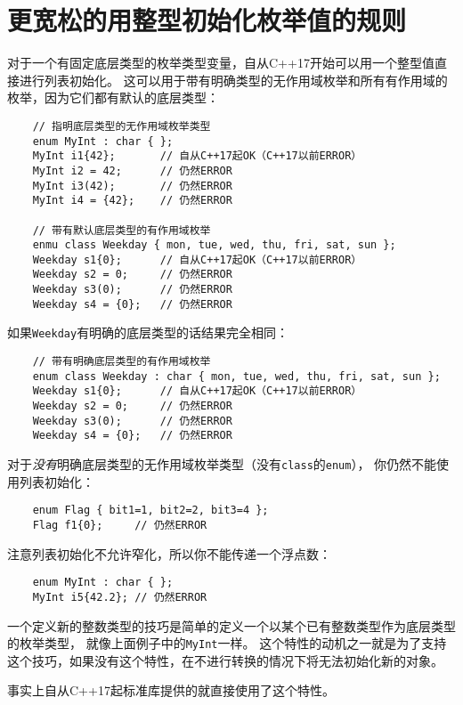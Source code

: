 \section{更宽松的用整型初始化枚举值的规则}\label{ch8.3}
对于一个有固定底层类型的枚举类型变量，自从C++17开始可以用一个整型值直接进行列表初始化。
这可以用于带有明确类型的无作用域枚举和所有有作用域的枚举，因为它们都有默认的底层类型：
\begin{lstlisting}
    // 指明底层类型的无作用域枚举类型
    enum MyInt : char { };
    MyInt i1{42};       // 自从C++17起OK（C++17以前ERROR）
    MyInt i2 = 42;      // 仍然ERROR
    MyInt i3(42);       // 仍然ERROR
    MyInt i4 = {42};    // 仍然ERROR

    // 带有默认底层类型的有作用域枚举
    enmu class Weekday { mon, tue, wed, thu, fri, sat, sun };
    Weekday s1{0};      // 自从C++17起OK（C++17以前ERROR）
    Weekday s2 = 0;     // 仍然ERROR
    Weekday s3(0);      // 仍然ERROR
    Weekday s4 = {0};   // 仍然ERROR
\end{lstlisting}
如果\texttt{Weekday}有明确的底层类型的话结果完全相同：
\begin{lstlisting}
    // 带有明确底层类型的有作用域枚举
    enum class Weekday : char { mon, tue, wed, thu, fri, sat, sun };
    Weekday s1{0};      // 自从C++17起OK（C++17以前ERROR）
    Weekday s2 = 0;     // 仍然ERROR
    Weekday s3(0);      // 仍然ERROR
    Weekday s4 = {0};   // 仍然ERROR
\end{lstlisting}
对于\emph{没有}明确底层类型的无作用域枚举类型（没有\texttt{class}的\texttt{enum}），
你仍然不能使用列表初始化：
\begin{lstlisting}
    enum Flag { bit1=1, bit2=2, bit3=4 };
    Flag f1{0};     // 仍然ERROR
\end{lstlisting}
注意列表初始化不允许窄化，所以你不能传递一个浮点数：
\begin{lstlisting}
    enum MyInt : char { };
    MyInt i5{42.2}; // 仍然ERROR
\end{lstlisting}
一个定义新的整数类型的技巧是简单的定义一个以某个已有整数类型作为底层类型的枚举类型，
就像上面例子中的\texttt{MyInt}一样。
这个特性的动机之一就是为了支持这个技巧，如果没有这个特性，在不进行转换的情况下将无法初始化新的对象。

事实上自从C++17起标准库提供的就直接使用了这个特性。

